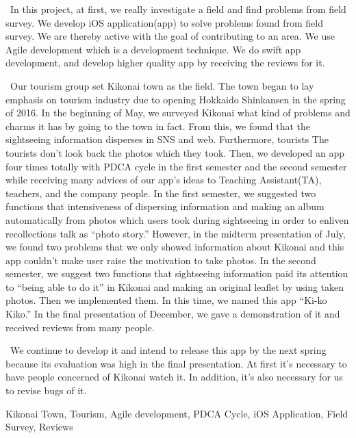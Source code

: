 \begin{eabstract} 

\ In this project, at first, we really investigate a field and find problems from field survey. We develop iOS application(app) to solve problems found from field survey. We are thereby active with the goal of contributing to an area. We use Agile development which is a development technique. We do swift app development, and develop higher quality app by receiving the reviews for it. 

\ Our tourism group set Kikonai town as the field. The town began to lay emphasis on tourism industry due to opening Hokkaido Shinkansen in the spring of 2016. In the beginning of May, we surveyed Kikonai what kind of problems and charms it has by going to the town in fact. From this, we found that the sightseeing information disperses in SNS and web. Furthermore, tourists The tourists don't look back the photos which they took. Then, we developed an app four times totally with PDCA cycle in the first semester and the second semester while receiving many advices of our app's ideas to Teaching Assistant(TA), teachers, and the company people. In the first semester, we suggested two functions that intensiveness of dispersing information and making an album automatically from photos which users took during sightseeing in order to enliven recollections talk as ``photo story.'' However, in the midterm presentation of July, we found two problems that we only showed information about Kikonai and this app couldn't make user raise the motivation to take photos. In the second semester, we suggest two functions that sightseeing information paid its attention to ``being able to do it'' in Kikonai and making an original leaflet by using taken photos. Then we implemented them. In this time, we named this app ``Ki-ko Kiko.'' In the final presentation of December, we gave a demonstration of it and received reviews from many people.

\ We continue to develop it and intend to release this app by the next spring because its evaluation was high in the final presentation. At first it's necessary to have people concerned of Kikonai watch it. In addition, it's also necessary for us to revise bugs of it.



\begin{ekeyword}
Kikonai Town, Tourism, Agile development, PDCA Cycle, iOS Application, Field Survey, Reviews
\end{ekeyword}
\end{eabstract}